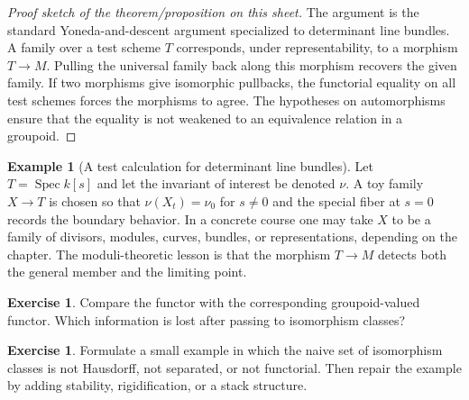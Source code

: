 \documentclass[11pt]{amsart}
\theoremstyle{definition}
\newtheorem{example}[theorem]{Example}
\newtheorem{exercise}[theorem]{Exercise}
\newcommand{\Spec}{\operatorname{Spec}}
\begin{document}
\begin{proof}[Proof sketch of the theorem/proposition on this sheet]
The argument is the standard Yoneda-and-descent argument specialized to determinant line bundles.  A family over a test scheme $T$ corresponds, under representability, to a morphism $T\to M$.  Pulling the universal family back along this morphism recovers the given family.  If two morphisms give isomorphic pullbacks, the functorial equality on all test schemes forces the morphisms to agree.  The hypotheses on automorphisms ensure that the equality is not weakened to an equivalence relation in a groupoid.
\end{proof}
\begin{example}[A test calculation for determinant line bundles]
Let $T=\Spec k[s]$ and let the invariant of interest be denoted $\nu$.  A toy family $X\to T$ is chosen so that $\nu(X_t)=\nu_0$ for $s\ne0$ and the special fiber at $s=0$ records the boundary behavior.  In a concrete course one may take $X$ to be a family of divisors, modules, curves, bundles, or representations, depending on the chapter.  The moduli-theoretic lesson is that the morphism $T\to M$ detects both the general member and the limiting point.
\end{example}
\begin{exercise}
Compare the functor with the corresponding groupoid-valued functor.  Which information is lost after passing to isomorphism classes?
\end{exercise}
\begin{exercise}
Formulate a small example in which the naive set of isomorphism classes is not Hausdorff, not separated, or not functorial.  Then repair the example by adding stability, rigidification, or a stack structure.
\end{exercise}
\clearpage
\end{document}
